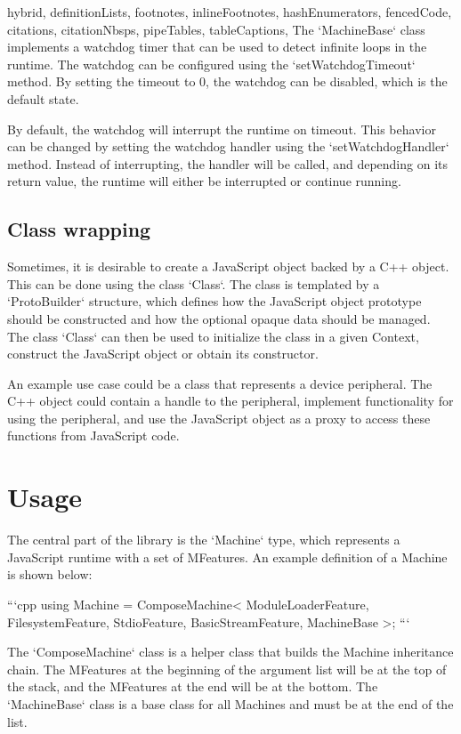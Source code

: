 \begin{markdown*}{%
  hybrid,
  definitionLists,
  footnotes,
  inlineFootnotes,
  hashEnumerators,
  fencedCode,
  citations,
  citationNbsps,
  pipeTables,
  tableCaptions,
}
The `MachineBase` class implements a watchdog timer that can be used to detect infinite loops in the runtime. The watchdog can be configured using the `setWatchdogTimeout` method. By setting the timeout to 0, the watchdog can be disabled, which is the default state.

By default, the watchdog will interrupt the runtime on timeout. This behavior can be changed by setting the watchdog handler using the `setWatchdogHandler` method. Instead of interrupting, the handler will be called, and depending on its return value, the runtime will either be interrupted or continue running.

\subsection{Class wrapping} \label{sub:class-wrapping}

Sometimes, it is desirable to create a JavaScript object backed by a C++ object. This can be done using the class `Class`. The class is templated by a `ProtoBuilder` structure, which defines how the JavaScript object prototype should be constructed and how the optional opaque data should be managed. The class `Class` can then be used to initialize the class in a given Context, construct the JavaScript object or obtain its constructor.

An example use case could be a class that represents a device peripheral. The C++ object could contain a handle to the peripheral, implement functionality for using the peripheral, and use the JavaScript object as a proxy to access these functions from JavaScript code.


\section{Usage} \label{sec:machine-usage}

The central part of the library is the `Machine` type, which represents a JavaScript runtime with a set of MFeatures. An example definition of a Machine is shown below:

```cpp
using Machine = ComposeMachine<
  ModuleLoaderFeature,
  FilesystemFeature,
  StdioFeature,
  BasicStreamFeature,
  MachineBase
>;
```

The `ComposeMachine` class is a helper class that builds the Machine inheritance chain. The MFeatures at the beginning of the argument list will be at the top of the stack, and the MFeatures at the end will be at the bottom. The `MachineBase` class is a base class for all Machines and must be at the end of the list.


\end{markdown*}
